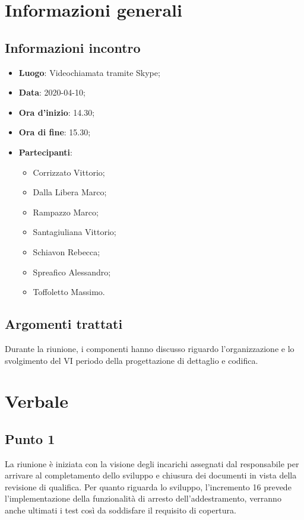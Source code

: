 \section{Informazioni generali}
    \subsection{Informazioni incontro}
        \begin{itemize}
            \item \textbf{Luogo}: Videochiamata tramite Skype;
            \item \textbf{Data}: 2020-04-10;
            \item \textbf{Ora d'inizio}: 14.30;
            \item \textbf{Ora di fine}: 15.30;
            \item \textbf{Partecipanti}: \begin{itemize}
                \item Corrizzato Vittorio;
                \item Dalla Libera Marco;
                \item Rampazzo Marco;
                \item Santagiuliana Vittorio;
                \item Schiavon Rebecca;
                \item Spreafico Alessandro;
                \item Toffoletto Massimo.
            \end{itemize}
        \end{itemize}
    \subsection{Argomenti trattati}
        Durante la riunione, i componenti hanno discusso riguardo l'organizzazione e lo svolgimento del VI periodo della progettazione di dettaglio e codifica.
\section{Verbale}
    \subsection{Punto 1}
        La riunione è iniziata con la visione degli incarichi assegnati dal responsabile per arrivare al completamento dello sviluppo e chiusura dei documenti in vista della revisione di qualifica. Per quanto riguarda lo sviluppo, l'incremento 16 prevede l'implementazione della funzionalità di arresto dell'addestramento, verranno anche ultimati i test così da soddisfare il requisito di copertura. 
